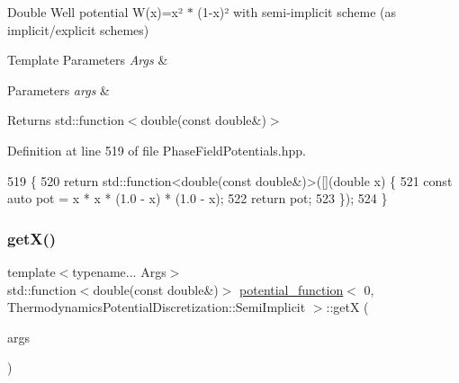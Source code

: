 Double Well potential W(x)=x² $\ast$ (1-\/x)² with semi-\/implicit scheme (as implicit/explicit schemes) 


\begin{DoxyTemplParams}{Template Parameters}
{\em Args} & \\
\hline
\end{DoxyTemplParams}

\begin{DoxyParams}{Parameters}
{\em args} & \\
\hline
\end{DoxyParams}
\begin{DoxyReturn}{Returns}
std\+::function$<$double(const double\&)$>$ 
\end{DoxyReturn}


Definition at line 519 of file Phase\+Field\+Potentials.\+hpp.


\begin{DoxyCode}
519                                                         \{
520     \textcolor{keywordflow}{return} std::function<double(const double&)>([](\textcolor{keywordtype}{double} x) \{
521       \textcolor{keyword}{const} \textcolor{keyword}{auto} pot = x * x * (1.0 - x) * (1.0 - x);
522       \textcolor{keywordflow}{return} pot;
523     \});
524   \}
\end{DoxyCode}
\mbox{\label{structpotential__function_3_010_00_01ThermodynamicsPotentialDiscretization_1_1SemiImplicit_01_4_a9c2d3c673cbe8c37d3e9c46820a7ea78}} 
\subsubsection{\texorpdfstring{get\+X()}{getX()}}
{\footnotesize\ttfamily template$<$typename... Args$>$ \\
std\+::function$<$double(const double\&)$>$ \hyperlink{structpotential__function}{potential\+\_\+function}$<$ 0, Thermodynamics\+Potential\+Discretization\+::\+Semi\+Implicit $>$\+::getX (\begin{DoxyParamCaption}\item[{Args...}]{args }\end{DoxyParamCaption})\hspace{0.3cm}{\ttfamily [inline]}}



